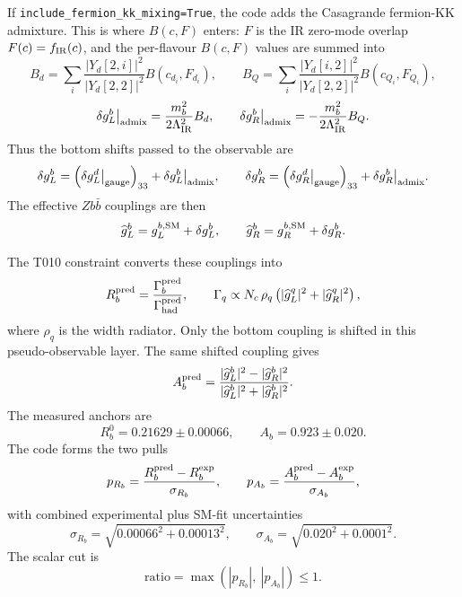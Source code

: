\documentclass[11pt]{article}
\newcommand{\LIR}{\Lambda_{\mathrm{IR}}}
\begin{document}
\smallskip
\noindent If \texttt{include\_fermion\_kk\_mixing=True}, the code adds the
Casagrande fermion-KK admixture. This is where $B(c,F)$ enters: $F$ is the
IR zero-mode overlap $F(c)=f_{\rm IR}(c)$, and the per-flavour $B(c,F)$ values
are summed into
\begin{equation}
B_d=\sum_i\frac{|Y_d[2,i]|^2}{|Y_d[2,2]|^2}B(c_{d_i},F_{d_i}),
\qquad
B_Q=\sum_i\frac{|Y_d[i,2]|^2}{|Y_d[2,2]|^2}B(c_{Q_i},F_{Q_i}),
\end{equation}
\begin{equation}
\delta g_L^b\big|_{\rm admix}=\frac{m_b^2}{2\LIR^2}B_d,
\qquad
\delta g_R^b\big|_{\rm admix}=-\frac{m_b^2}{2\LIR^2}B_Q .
\end{equation}
Thus the bottom shifts passed to the observable are
\begin{equation}
\delta g_L^b
=\left(\delta g_L^d\big|_{\rm gauge}\right)_{33}
+\delta g_L^b\big|_{\rm admix},
\qquad
\delta g_R^b
=\left(\delta g_R^d\big|_{\rm gauge}\right)_{33}
+\delta g_R^b\big|_{\rm admix}.
\end{equation}
The effective $Zb\bar b$ couplings are then
\begin{equation}
\widehat g_L^b=g_L^{b,{\rm SM}}+\delta g_L^b,
\qquad
\widehat g_R^b=g_R^{b,{\rm SM}}+\delta g_R^b .
\end{equation}

\smallskip
\noindent The T010 constraint converts these couplings into
\begin{equation}
R_b^{\rm pred}=\frac{\Gamma_b^{\rm pred}}{\Gamma_{\rm had}^{\rm pred}},
\qquad
\Gamma_q\propto N_c\,\rho_q\left(|\widehat g_L^q|^2+|\widehat g_R^q|^2\right),
\end{equation}
where $\rho_q$ is the width radiator. Only the bottom coupling is shifted in
this pseudo-observable layer. The same shifted coupling gives
\begin{equation}
A_b^{\rm pred}
=\frac{|\widehat g_L^b|^2-|\widehat g_R^b|^2}
{|\widehat g_L^b|^2+|\widehat g_R^b|^2}.
\end{equation}
The measured anchors are
\begin{equation}
R_b^0=0.21629\pm0.00066,
\qquad
A_b=0.923\pm0.020 .
\end{equation}
The code forms the two pulls
\begin{equation}
p_{R_b}=\frac{R_b^{\rm pred}-R_b^{\rm exp}}{\sigma_{R_b}},
\qquad
p_{A_b}=\frac{A_b^{\rm pred}-A_b^{\rm exp}}{\sigma_{A_b}},
\end{equation}
with combined experimental plus SM-fit uncertainties
\begin{equation}
\sigma_{R_b}=\sqrt{0.00066^2+0.00013^2},
\qquad
\sigma_{A_b}=\sqrt{0.020^2+0.0001^2}.
\end{equation}
The scalar cut is
\begin{equation}
\boxed{\;
\mathrm{ratio}=\max\left(|p_{R_b}|,\ |p_{A_b}|\right)\le1 .
\;}
\end{equation}
\end{document}
